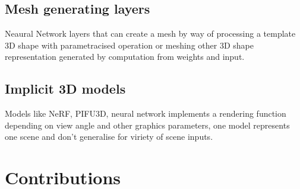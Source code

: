 \subsection{Mesh generating layers}

Neaural Network layers that can create a mesh by way of processing a template 3D shape with parametracised operation or meshing other 3D shape representation generated by computation from weights and input.

\subsection{Implicit 3D models}

Models like NeRF, PIFU3D, neural network implements a rendering function depending on view angle and other graphics parameters, one model represents one scene and don't generalise for viriety of scene inputs.

\section{Contributions}

 

